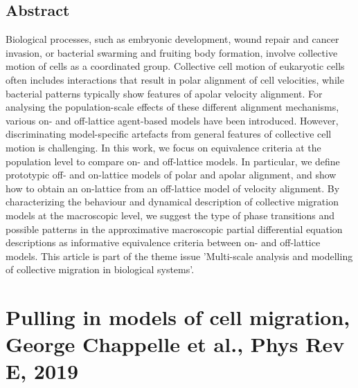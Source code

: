 \documentclass[11pt,a4paper]{article}
\begin{document}
\subsection*{Abstract}
Biological processes, such as embryonic development, wound repair and cancer invasion, or bacterial swarming and fruiting body formation, involve collective motion of cells as a coordinated group. Collective cell motion of eukaryotic cells often includes interactions that result in polar alignment of cell velocities, while bacterial patterns typically show features of apolar velocity alignment. For analysing the population-scale effects of these different alignment mechanisms, various on- and off-lattice agent-based models have been introduced. However, discriminating model-specific artefacts from general features of collective cell motion is challenging. In this work, we focus on equivalence criteria at the population level to compare on- and off-lattice models. In particular, we define prototypic off- and on-lattice models of polar and apolar alignment, and show how to obtain an on-lattice from an off-lattice model of velocity alignment. By characterizing the behaviour and dynamical description of collective migration models at the macroscopic level, we suggest the type of phase transitions and possible patterns in the approximative macroscopic partial differential equation descriptions as informative equivalence criteria between on- and off-lattice models. This article is part of the theme issue 'Multi-scale analysis and modelling of collective migration in biological systems'. 

\section*{Pulling in models of cell migration, George Chappelle et al., Phys Rev E, 2019}
\end{document}
